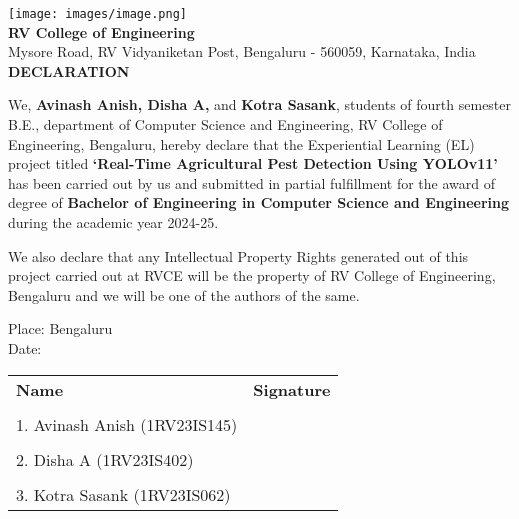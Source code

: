 \newpage
\thispagestyle{empty}


\begin{center}
    \texttt{[image: images/image.png]}\\[0.5cm]
    \textbf{\large RV College of Engineering\textsuperscript{\textregistered}}\\
    Mysore Road, RV Vidyaniketan Post, Bengaluru - 560059, Karnataka, India\\[1cm]

    \textbf{\LARGE DECLARATION}\\[1cm]
\end{center}

\noindent
We, \textbf{Avinash Anish, Disha A,} and \textbf{Kotra Sasank}, students of fourth semester B.E., department of Computer Science and Engineering, RV College of Engineering, Bengaluru, hereby declare that the Experiential Learning (EL) project titled \textbf{`Real-Time Agricultural Pest Detection Using YOLOv11'} has been carried out by us and submitted in partial fulfillment for the award of degree of \textbf{Bachelor of Engineering in Computer Science and Engineering} during the academic year 2024-25.

\vspace{1cm}

\noindent
We also declare that any Intellectual Property Rights generated out of this project carried out at RVCE will be the property of RV College of Engineering, Bengaluru and we will be one of the authors of the same.

\vspace{2cm}

\noindent
Place: Bengaluru \\[1cm]
Date:

\vfill

\noindent
\begin{tabular}{@{}p{}p{}@{}}
    \textbf{Name} & \textbf{Signature} \\
    \vspace{0.5cm} \\
    1. Avinash Anish (1RV23IS145) & \\
    \vspace{1cm} \\
    2. Disha A (1RV23IS402) & \\
    \vspace{1cm} \\
    3. Kotra Sasank (1RV23IS062) & \\
\end{tabular}

\vfill
